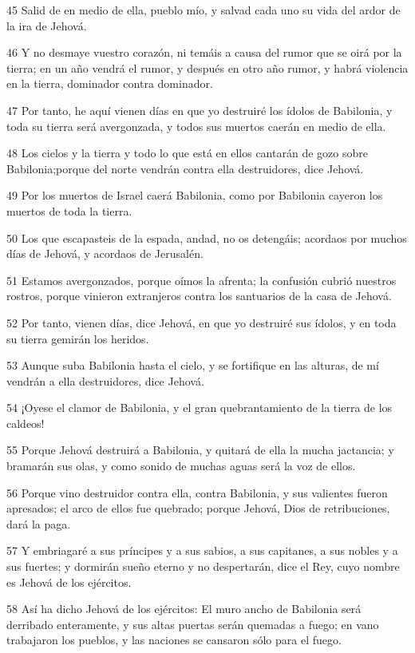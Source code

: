 \par 45 Salid de en medio de ella, pueblo mío, y salvad cada uno su vida del ardor de la ira de Jehová.
\par 46 Y no desmaye vuestro corazón, ni temáis a causa del rumor que se oirá por la tierra; en un año vendrá el rumor, y después en otro año rumor, y habrá violencia en la tierra, dominador contra dominador.
\par 47 Por tanto, he aquí vienen días en que yo destruiré los ídolos de Babilonia, y toda su tierra será avergonzada, y todos sus muertos caerán en medio de ella.
\par 48 Los cielos y la tierra y todo lo que está en ellos cantarán de gozo sobre Babilonia;porque del norte vendrán contra ella destruidores, dice Jehová.
\par 49 Por los muertos de Israel caerá Babilonia, como por Babilonia cayeron los muertos de toda la tierra.
\par 50 Los que escapasteis de la espada, andad, no os detengáis; acordaos por muchos días de Jehová, y acordaos de Jerusalén.
\par 51 Estamos avergonzados, porque oímos la afrenta; la confusión cubrió nuestros rostros, porque vinieron extranjeros contra los santuarios de la casa de Jehová.
\par 52 Por tanto, vienen días, dice Jehová, en que yo destruiré sus ídolos, y en toda su tierra gemirán los heridos.
\par 53 Aunque suba Babilonia hasta el cielo, y se fortifique en las alturas, de mí vendrán a ella destruidores, dice Jehová.
\par 54 ¡Oyese el clamor de Babilonia, y el gran quebrantamiento de la tierra de los caldeos!
\par 55 Porque Jehová destruirá a Babilonia, y quitará de ella la mucha jactancia; y bramarán sus olas, y como sonido de muchas aguas será la voz de ellos.
\par 56 Porque vino destruidor contra ella, contra Babilonia, y sus valientes fueron apresados; el arco de ellos fue quebrado; porque Jehová, Dios de retribuciones, dará la paga.
\par 57 Y embriagaré a sus príncipes y a sus sabios, a sus capitanes, a sus nobles y a sus fuertes; y dormirán sueño eterno y no despertarán, dice el Rey, cuyo nombre es Jehová de los ejércitos.
\par 58 Así ha dicho Jehová de los ejércitos: El muro ancho de Babilonia será derribado enteramente, y sus altas puertas serán quemadas a fuego; en vano trabajaron los pueblos, y las naciones se cansaron sólo para el fuego.
